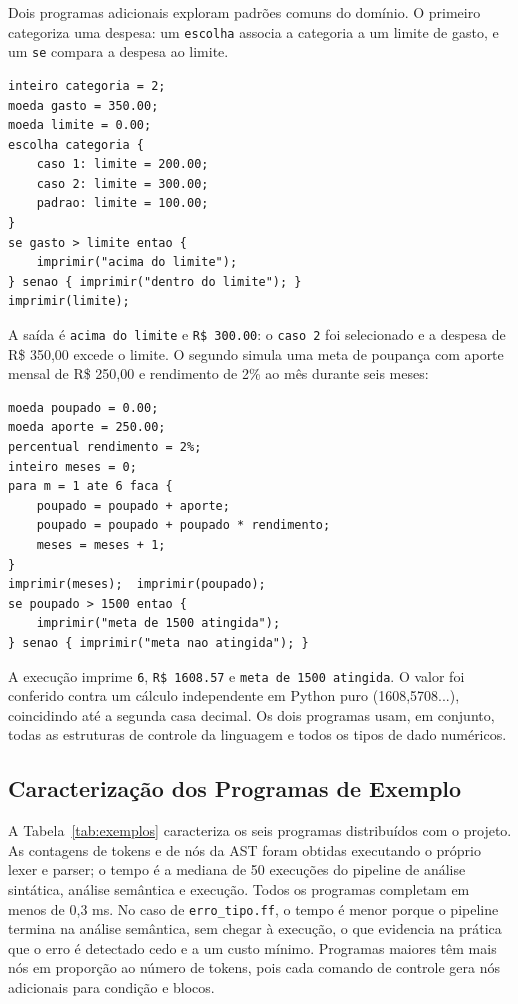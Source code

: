\documentclass[conference]{IEEEtran}
\begin{document}
Dois programas adicionais exploram padrões comuns do domínio. O primeiro categoriza uma despesa: um \texttt{escolha} associa a categoria a um limite de gasto, e um \texttt{se} compara a despesa ao limite.
\begin{minipage}{\columnwidth}\begin{lstlisting}
inteiro categoria = 2;
moeda gasto = 350.00;
moeda limite = 0.00;
escolha categoria {
    caso 1: limite = 200.00;
    caso 2: limite = 300.00;
    padrao: limite = 100.00;
}
se gasto > limite entao {
    imprimir("acima do limite");
} senao { imprimir("dentro do limite"); }
imprimir(limite);
\end{lstlisting}\end{minipage}\par\smallskip
A saída é \texttt{acima do limite} e \texttt{R\$ 300.00}: o \texttt{caso 2} foi selecionado e a despesa de R\$ 350,00 excede o limite. O segundo simula uma meta de poupança com aporte mensal de R\$ 250,00 e rendimento de 2\% ao mês durante seis meses:
\begin{minipage}{\columnwidth}\begin{lstlisting}
moeda poupado = 0.00;
moeda aporte = 250.00;
percentual rendimento = 2%;
inteiro meses = 0;
para m = 1 ate 6 faca {
    poupado = poupado + aporte;
    poupado = poupado + poupado * rendimento;
    meses = meses + 1;
}
imprimir(meses);  imprimir(poupado);
se poupado > 1500 entao {
    imprimir("meta de 1500 atingida");
} senao { imprimir("meta nao atingida"); }
\end{lstlisting}\end{minipage}\par\smallskip
A execução imprime \texttt{6}, \texttt{R\$ 1608.57} e \texttt{meta de 1500 atingida}. O valor foi conferido contra um cálculo independente em Python puro (1608,5708...), coincidindo até a segunda casa decimal. Os dois programas usam, em conjunto, todas as estruturas de controle da linguagem e todos os tipos de dado numéricos.

\subsection{Caracterização dos Programas de Exemplo}

A Tabela~\ref{tab:exemplos} caracteriza os seis programas distribuídos com o projeto. As contagens de tokens e de nós da AST foram obtidas executando o próprio lexer e parser; o tempo é a mediana de 50 execuções do pipeline de análise sintática, análise semântica e execução. Todos os programas completam em menos de 0,3 ms. No caso de \texttt{erro\_tipo.ff}, o tempo é menor porque o pipeline termina na análise semântica, sem chegar à execução, o que evidencia na prática que o erro é detectado cedo e a um custo mínimo. Programas maiores têm mais nós em proporção ao número de tokens, pois cada comando de controle gera nós adicionais para condição e blocos.
\end{document}
